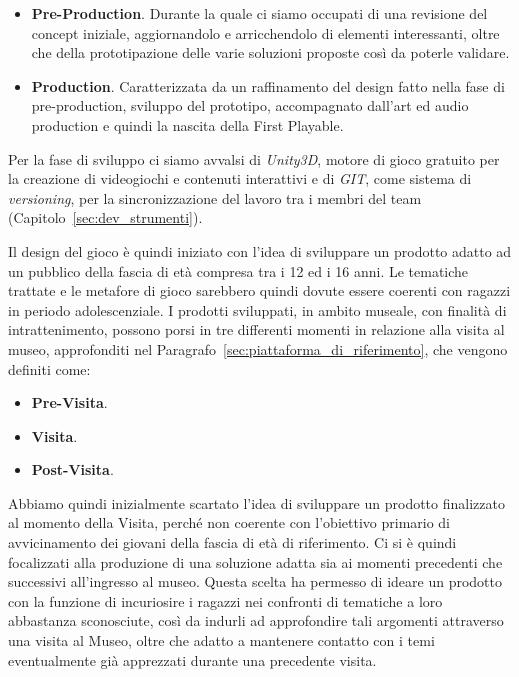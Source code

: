 \begin{itemize}
	\item \textbf{Pre-Production}. Durante la quale ci siamo occupati di una revisione del concept iniziale, aggiornandolo e arricchendolo di elementi interessanti, oltre che della prototipazione delle varie soluzioni proposte così da poterle validare.
	\item \textbf{Production}. Caratterizzata da un raffinamento del design fatto nella fase di pre-production, sviluppo del prototipo, accompagnato dall’art ed audio production e quindi la nascita della First Playable.
\end{itemize}

Per la fase di sviluppo ci siamo avvalsi di \textit{Unity3D}, motore di gioco gratuito per la creazione di videogiochi e contenuti interattivi e di \textit{GIT}, come sistema di \textit{versioning}, per la sincronizzazione del lavoro tra i membri del team (Capitolo~\ref{sec:dev_strumenti}).

Il design del gioco è quindi iniziato con l’idea di sviluppare un prodotto adatto ad un pubblico della fascia di età compresa tra i 12 ed i 16 anni. Le tematiche trattate e le metafore di gioco sarebbero quindi dovute essere coerenti con ragazzi in periodo adolescenziale.
I prodotti sviluppati, in ambito museale, con finalità di intrattenimento, possono porsi in tre differenti momenti in relazione alla visita al museo, approfonditi nel Paragrafo~\ref{sec:piattaforma_di_riferimento}, che vengono definiti come:

\begin{itemize}
	\item \textbf{Pre-Visita}.
	\item \textbf{Visita}.
	\item \textbf{Post-Visita}.
\end{itemize}

Abbiamo quindi inizialmente scartato l’idea di sviluppare un prodotto finalizzato al momento della Visita, perché non coerente con l’obiettivo primario di avvicinamento dei giovani della fascia di età di riferimento. Ci si è quindi focalizzati alla produzione di una soluzione adatta sia ai momenti precedenti che successivi all’ingresso al museo. Questa scelta ha permesso di ideare un prodotto con la funzione di incuriosire i ragazzi nei confronti di tematiche a loro abbastanza sconosciute, così da indurli ad approfondire tali argomenti attraverso una visita al Museo, oltre che adatto a mantenere contatto con i temi eventualmente già apprezzati durante una precedente visita.

